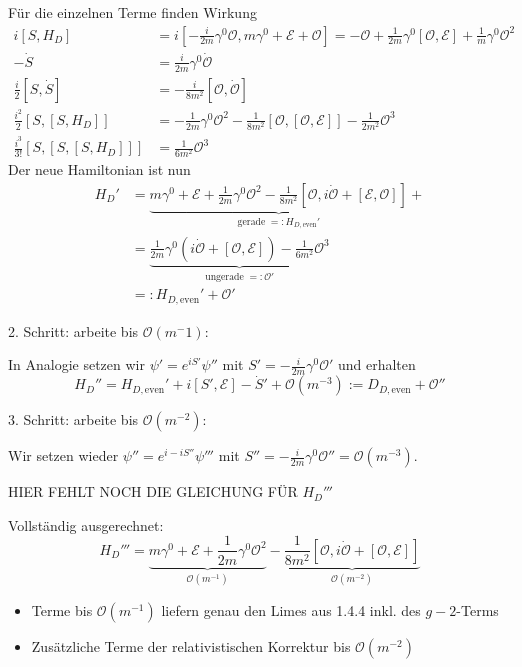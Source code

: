 \documentclass[11pt,a4paper]{report}
\begin{document}
Für die einzelnen Terme finden Wirkung
\begin{align*}
    i [S, H_D] &= i \left[-\frac{i}{2m} \gamma^0 \mathcal{O}, m \gamma^0 + \mathcal{E} + \mathcal{O} \right] = -\mathcal{O} + \frac{1}{2m} \gamma^0 [\mathcal{O}, \mathcal{E}] + \frac{1}{m} \gamma^0 \mathcal{O}^2 \\
    - \dot{S} &= \frac{i}{2m} \gamma^0 \dot{\mathcal{O}} \\
    \frac{i}{2} [S, \dot{S}] &= -\frac{i}{8 m^2} [\mathcal{O}, \dot{\mathcal{O}}] \\
    \frac{i^2}{2} [S, [S, H_D]] &= -\frac{1}{2m} \gamma^0 \mathcal{O}^2 - \frac{1}{8 m^2} [\mathcal{O}, [\mathcal{O}, \mathcal{E}]] - \frac{1}{2m^2} \mathcal{O}^3 \\
    \frac{i^3}{3!} [S, [S, [S, H_D]]] &= \frac{1}{6m^2} \mathcal{O}^3
\end{align*}
Der neue Hamiltonian ist nun
\begin{align*}
    H_D' &=\underbrace{m \gamma^0 + \mathcal{E} + \frac{1}{2m} \gamma^0 \mathcal{O}^2 - \frac{1}{8 m^2} [\mathcal{O}, i \dot{\mathcal{O}} + [\mathcal{E}, \mathcal{O}]]}_{\text{gerade} \;=: H_{D,\text{even}}'} + \\
    &= \underbrace{\frac{1}{2m} \gamma^0 (i \dot{\mathcal{O}} + [\mathcal{O}, \mathcal{E}]) - \frac{1}{6m^2} \mathcal{O}^3}_{\text{ungerade} \; =: \mathcal{O}'} \\
    &=: H_{D,\text{even}}' + \mathcal{O}'
\end{align*}

2. Schritt: arbeite bis $\mathcal{O}(m^-1)$: 

In Analogie setzen wir $\psi' = e^{i S'} \psi''$ mit $S' = -\frac{i}{2m} \gamma^0 \mathcal{O}'$ und erhalten
$$H_D'' = H_{D,\text{even}}' + i [S', \mathcal{E}] - \dot{S}' + \mathcal{O}(m^{-3}) := D_{D,\text{even}} + \mathcal{O}''$$

3. Schritt: arbeite bis $\mathcal{O}(m^{-2})$:

Wir setzen wieder $\psi'' = e^{i-i S''} \psi'''$ mit $S'' = -\frac{i}{2m} \gamma^0 \mathcal{O}'' = \mathcal{O}(m^{-3})$.

HIER FEHLT NOCH DIE GLEICHUNG FÜR $H_D'''$

Vollständig ausgerechnet:
$$H_D''' = \underbrace{m\gamma^0 + \mathcal{E} + \frac{1}{2m} \gamma^0 \mathcal{O}^2}_{\mathcal{O}(m^{-1})} - \underbrace{\frac{1}{8m^2} [\mathcal{O}, i \dot{\mathcal{O}} + [\mathcal{O}, \mathcal{E}]]}_{\mathcal{O}(m^{-2})}$$

\begin{itemize}
    \item Terme bis $\mathcal{O}(m^{-1})$ liefern genau den Limes aus 1.4.4 inkl. des $g-2$-Terms
    \item Zusätzliche Terme der relativistischen Korrektur bis $\mathcal{O}(m^{-2})$
\end{itemize}
\end{document}
